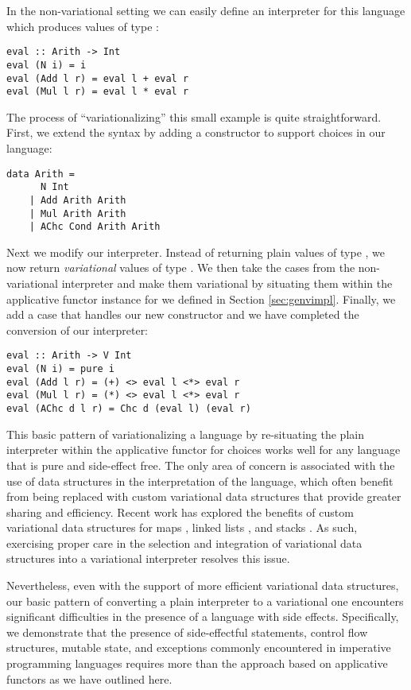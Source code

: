 \documentclass[12pt,oneside]{book}
\begin{document}
In the non-variational setting we can easily define an interpreter for this language which produces
values of type :

\begin{lstlisting}
eval :: Arith -> Int
eval (N i) = i
eval (Add l r) = eval l + eval r
eval (Mul l r) = eval l * eval r
\end{lstlisting}

The process of ``variationalizing'' this small example is quite straightforward. First, we extend the syntax by adding a
constructor to support choices in our language:

\begin{lstlisting}
data Arith =
      N Int
    | Add Arith Arith
    | Mul Arith Arith
    | AChc Cond Arith Arith
\end{lstlisting}

Next we modify our interpreter. Instead of returning plain values of type ,
we now return \emph{variational} values of type . We then take the cases
from the non-variational interpreter and make them variational by situating them within the
applicative functor instance for  we defined in Section \ref{sec:genvimpl}. Finally, we add a case
that handles our new  constructor and we have completed the conversion of our
interpreter:

\begin{lstlisting}
eval :: Arith -> V Int
eval (N i) = pure i
eval (Add l r) = (+) <> eval l <*> eval r
eval (Mul l r) = (*) <> eval l <*> eval r
eval (AChc d l r) = Chc d (eval l) (eval r)
\end{lstlisting}

This basic pattern of variationalizing a language by re-situating the
plain interpreter within the applicative functor for choices works well for any language that is pure
and side-effect free. The only area of concern is associated with the use of data structures in the
interpretation of the language, which often benefit from being replaced with custom variational data structures that
provide greater sharing and efficiency. Recent work has explored the benefits of custom variational
data structures for maps \cite{Walk14onward}, linked lists \cite{lists}, and stacks \cite{MMWWK17vamos}.
As such, exercising proper care in the selection and integration of variational data structures
into a variational interpreter resolves this issue.

Nevertheless, even with the support of more efficient
variational data structures, our basic pattern of converting a plain interpreter to a variational one
encounters significant difficulties in the presence of a language with side effects. Specifically, we
demonstrate that the presence of side-effectful statements, control flow structures, mutable state, and exceptions
commonly encountered in imperative programming languages requires more than the approach based
on applicative functors as we have outlined here.
\end{document}
